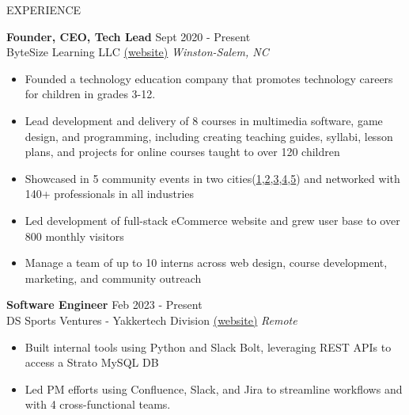\documentclass{resume} %
\begin{document}
\begin{rSection}{EXPERIENCE}

\textbf{Founder, CEO, Tech Lead} \hfill Sept 2020 - Present\\
ByteSize Learning LLC \href{https://www.bytesizelearning.org/}{(website)} \hfill \textit{Winston-Salem, NC}
 \begin{itemize}
    \itemsep -2pt {}
     \item Founded a technology education company that promotes technology careers for children in grades 3-12.
     \item Lead development and delivery of 8 courses in multimedia software, game design, and programming, including creating teaching guides, syllabi, lesson plans, and projects for online courses taught to over 120 children
     \item Showcased in 5 community events in two cities(\href{https://www.youtube.com/watch?v=eWJ8lB9IxeY&t=2642s}{1},\href{https://www.youtube.com/watch?v=MBwIT_pzApw&t}{2},\href{https://ideascity.events.wfu.edu/}{3},\href{https://www.facebook.com/events/kaleideum-north/nc-science-festival-stem-innovation-expo/3122862374592766/}{4},\href{https://techdayhq.com/new-york/attending}{5}) and networked with 140+ professionals in all industries
     \item Led development of full-stack eCommerce website and grew user base to over 800 monthly visitors
     \item Manage a team of up to 10 interns across web design, course development, marketing, and community outreach
 \end{itemize}

\textbf{Software Engineer} \hfill Feb 2023 - Present\\
DS Sports Ventures - Yakkertech Division \href{https://www.yakkertech.com/}{(website)} \hfill \textit{Remote}
 \begin{itemize}
    \itemsep -2pt {} 
     \item Built internal tools using Python and Slack Bolt, leveraging REST APIs to access a Strato MySQL DB
     \item Led PM efforts using Confluence, Slack, and Jira to streamline workflows and with 4 cross-functional teams.
 \end{itemize}


\end{rSection}
\end{document}
